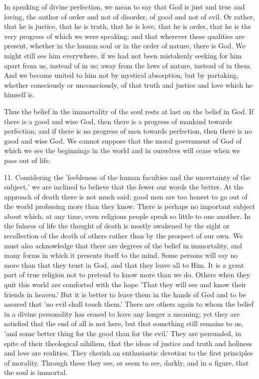 In speaking of divine perfection, we mean to say that God is just and
true and loving, the author of order and not of disorder, of good and
not of evil. Or rather, that he is justice, that he is truth, that he
is love, that he is order, that he is the very progress of which we were
speaking; and that wherever these qualities are present, whether in the
human soul or in the order of nature, there is God. We might still see
him everywhere, if we had not been mistakenly seeking for him apart from
us, instead of in us; away from the laws of nature, instead of in
them. And we become united to him not by mystical absorption, but by
partaking, whether consciously or unconsciously, of that truth and
justice and love which he himself is.

Thus the belief in the immortality of the soul rests at last on the
belief in God. If there is a good and wise God, then there is a progress
of mankind towards perfection; and if there is no progress of men
towards perfection, then there is no good and wise God. We cannot
suppose that the moral government of God of which we see the beginnings
in the world and in ourselves will cease when we pass out of life.

11. Considering the 'feebleness of the human faculties and the
uncertainty of the subject,' we are inclined to believe that the fewer
our words the better. At the approach of death there is not much said;
good men are too honest to go out of the world professing more than they
know. There is perhaps no important subject about which, at any time,
even religious people speak so little to one another. In the fulness
of life the thought of death is mostly awakened by the sight or
recollection of the death of others rather than by the prospect of our
own. We must also acknowledge that there are degrees of the belief in
immortality, and many forms in which it presents itself to the mind.
Some persons will say no more than that they trust in God, and that they
leave all to Him. It is a great part of true religion not to pretend
to know more than we do. Others when they quit this world are comforted
with the hope 'That they will see and know their friends in heaven.' But
it is better to leave them in the hands of God and to be assured that
'no evil shall touch them.' There are others again to whom the belief in
a divine personality has ceased to have any longer a meaning; yet they
are satisfied that the end of all is not here, but that something still
remains to us, 'and some better thing for the good than for the evil.'
They are persuaded, in spite of their theological nihilism, that the
ideas of justice and truth and holiness and love are realities. They
cherish an enthusiastic devotion to the first principles of morality.
Through these they see, or seem to see, darkly, and in a figure, that
the soul is immortal.


